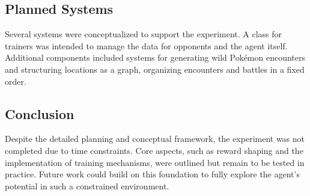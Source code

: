\subsection{Planned Systems}
Several systems were conceptualized to support the experiment. A class for trainers was intended to manage the data for opponents and the agent itself. Additional components included systems for generating wild Pokémon encounters and structuring locations as a graph, organizing encounters and battles in a fixed order.

\subsection{Conclusion}
Despite the detailed planning and conceptual framework, the experiment was not completed due to time constraints. Core aspects, such as reward shaping and the implementation of training mechanisms, were outlined but remain to be tested in practice. Future work could build on this foundation to fully explore the agent’s potential in such a constrained environment.